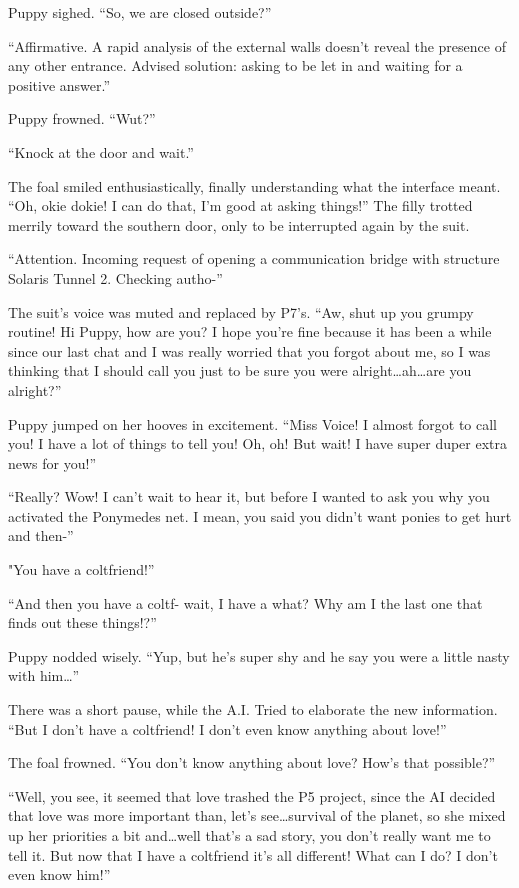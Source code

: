 Puppy sighed. ``So, we are closed outside?''

``{\mt Affirmative. A rapid analysis of the external walls doesn't reveal the presence of any other entrance. Advised solution: asking to be let in and waiting for a positive answer.}''

Puppy frowned. ``Wut?''

``Knock at the door and wait.''

The foal smiled enthusiastically, finally understanding what the interface meant. ``Oh, okie dokie! I can do that, I'm good at asking things!'' The filly trotted merrily toward the southern door, only to be interrupted again by the suit.

``{\mt Attention. Incoming request of opening a communication bridge with structure Solaris Tunnel 2. Checking autho-}''

The suit's voice was muted and replaced by P7's. ``Aw, shut up you grumpy routine! Hi Puppy, how are you? I hope you're fine because it has been a while since our last chat and I was really worried that you forgot about me, so I was thinking that I should call you just to be sure you were alright\dots ah\dots are you alright?''

Puppy jumped on her hooves in excitement. ``Miss Voice! I almost forgot to call you! I have a lot of things to tell you! Oh, oh! But wait! I have super duper extra news for you!''

``Really? Wow! I can't wait to hear it, but before I wanted to ask you why you activated the Ponymedes net. I mean, you said you didn't want ponies to get hurt and then-''

"You have a coltfriend!''

``And then you have a coltf- wait, I have a what? Why am I the last one that finds out these things!?''

Puppy nodded wisely. ``Yup, but he's super shy and he say you were a little nasty with him\dots''

There was a short pause, while the A.I. Tried to elaborate the new information. ``But I don't have a coltfriend! I don't even know anything about love!''

The foal frowned. ``You don't know anything about love? How's that possible?''

``Well, you see, it seemed that love trashed the P5 project, since the AI decided that love was more important than, let's see\dots survival of the planet, so she mixed up her priorities a bit and\dots well that's a sad story, you don't really want me to tell it. But now that I have a coltfriend it's all different! What can I do? I don't even know him!''

